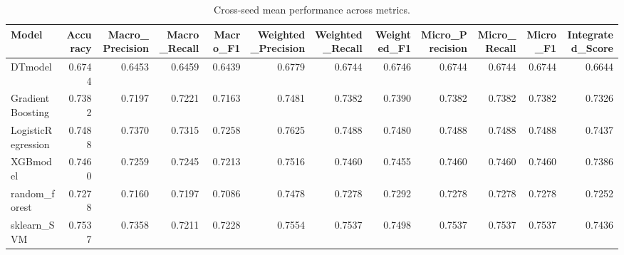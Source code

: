\begin{table}[t]
\centering
\begin{tabular}{lrrrrrrrrrrr}
\toprule
Model & Accuracy & Macro_Precision & Macro_Recall & Macro_F1 & Weighted_Precision & Weighted_Recall & Weighted_F1 & Micro_Precision & Micro_Recall & Micro_F1 & Integrated_Score \\
\midrule
DTmodel & 0.6744 & 0.6453 & 0.6459 & 0.6439 & 0.6779 & 0.6744 & 0.6746 & 0.6744 & 0.6744 & 0.6744 & 0.6644 \\
GradientBoosting & 0.7382 & 0.7197 & 0.7221 & 0.7163 & 0.7481 & 0.7382 & 0.7390 & 0.7382 & 0.7382 & 0.7382 & 0.7326 \\
LogisticRegression & 0.7488 & 0.7370 & 0.7315 & 0.7258 & 0.7625 & 0.7488 & 0.7480 & 0.7488 & 0.7488 & 0.7488 & 0.7437 \\
XGBmodel & 0.7460 & 0.7259 & 0.7245 & 0.7213 & 0.7516 & 0.7460 & 0.7455 & 0.7460 & 0.7460 & 0.7460 & 0.7386 \\
random_forest & 0.7278 & 0.7160 & 0.7197 & 0.7086 & 0.7478 & 0.7278 & 0.7292 & 0.7278 & 0.7278 & 0.7278 & 0.7252 \\
sklearn_SVM & 0.7537 & 0.7358 & 0.7211 & 0.7228 & 0.7554 & 0.7537 & 0.7498 & 0.7537 & 0.7537 & 0.7537 & 0.7436 \\
\bottomrule
\end{tabular}
\caption{Cross-seed mean performance across metrics.}
\label{tab:cross_seed_mean}
\end{table}